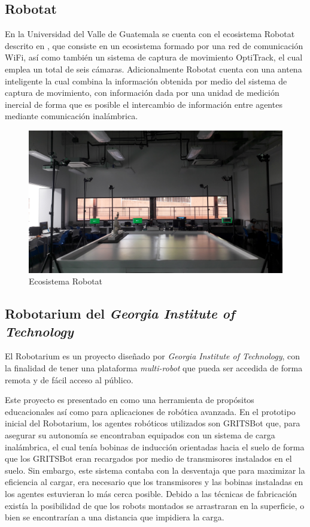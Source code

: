 \subsection*{Robotat}

En la Universidad del Valle de Guatemala se cuenta con el ecosistema Robotat descrito
 en \cite{perafan_montoya_robotat_2022}, que consiste en un ecosistema formado por una red
 de comunicación WiFi, así como también un sistema de captura de movimiento OptiTrack, el 
 cual emplea un total de seis cámaras. Adicionalmente Robotat cuenta con una antena inteligente la cual
 combina la información obtenida por medio del sistema de captura de movimiento, con información dada
 por una unidad de medición inercial de forma que es posible el intercambio de información entre agentes
 mediante comunicación inalámbrica.

\begin{figure}[H]
        \centering
        \includegraphics[scale=.4]{imagenes/robotat.png}
        \caption{Ecosistema Robotat \cite{perafan_montoya_robotat_2022}}
        \label{fig:robotat}
\end{figure}

\subsection*{Robotarium del \textit{Georgia Institute of Technology}}

El Robotarium es un proyecto diseñado por \textit{Georgia Institute of Technology}, con la finalidad
de tener una plataforma \textit{multi-robot} que pueda ser accedida de forma remota y de fácil acceso al público.

Este proyecto es presentado en \cite{wilson_robotarium_2021} como una herramienta de propósitos educacionales
así como para aplicaciones de robótica avanzada. 
En el prototipo inicial del Robotarium, los agentes robóticos utilizados son
GRITSBot que, para asegurar su autonomía se encontraban equipados con un sistema de carga inalámbrica,
 el cual tenía bobinas de inducción orientadas hacia el suelo
de forma que los GRITSBot eran recargados por medio de transmisores instalados en el suelo. Sin embargo, este sistema
contaba con la desventaja que para maximizar la eficiencia al cargar,  era necesario que los 
transmisores y las bobinas instaladas en los agentes estuvieran lo más cerca posible. Debido a las técnicas
 de fabricación existía la posibilidad de que los robots montados se arrastraran en la superficie,
o bien se encontrarían a una distancia que impidiera la carga.

